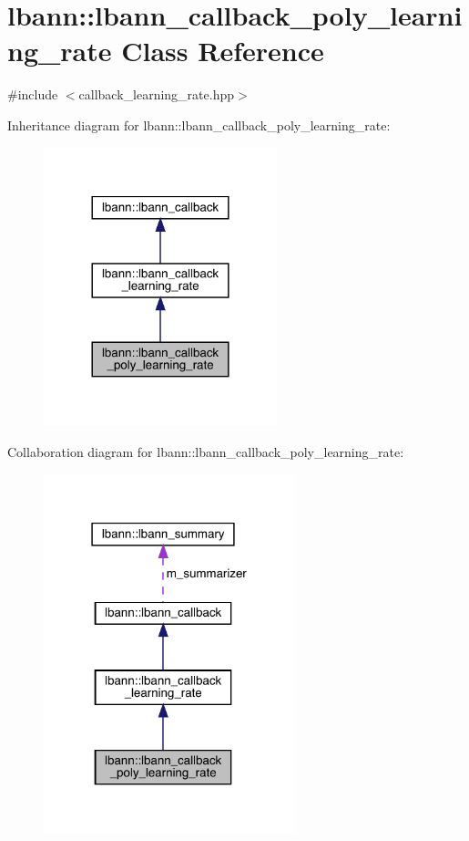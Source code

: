 \hypertarget{classlbann_1_1lbann__callback__poly__learning__rate}{}\section{lbann\+:\+:lbann\+\_\+callback\+\_\+poly\+\_\+learning\+\_\+rate Class Reference}
\label{classlbann_1_1lbann__callback__poly__learning__rate}


{\ttfamily \#include $<$callback\+\_\+learning\+\_\+rate.\+hpp$>$}



Inheritance diagram for lbann\+:\+:lbann\+\_\+callback\+\_\+poly\+\_\+learning\+\_\+rate\+:\nopagebreak
\begin{figure}[H]
\begin{center}
\leavevmode
\includegraphics[width=192pt]{classlbann_1_1lbann__callback__poly__learning__rate__inherit__graph}
\end{center}
\end{figure}


Collaboration diagram for lbann\+:\+:lbann\+\_\+callback\+\_\+poly\+\_\+learning\+\_\+rate\+:\nopagebreak
\begin{figure}[H]
\begin{center}
\leavevmode
\includegraphics[width=207pt]{classlbann_1_1lbann__callback__poly__learning__rate__coll__graph}
\end{center}
\end{figure}
